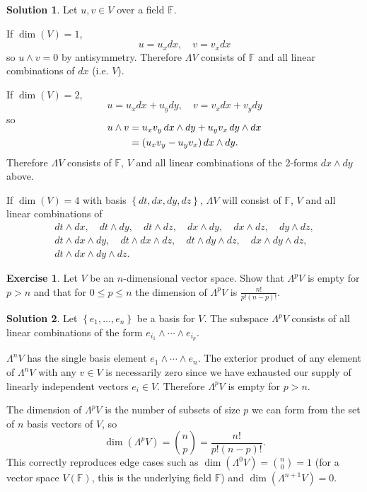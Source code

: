 \documentclass[11pt, a4paper]{report}
\theoremstyle{definition}
\newtheorem{exercise}{Exercise}[part]
\newtheorem{solution}{Solution}[part]
\newenvironment{ex}{\begin{exercise}}{\end{exercise}\pagebreak[1]}
\newenvironment{sol}{\begin{solution}}{\end{solution}\pagebreak[3]}
\renewcommand{\leq}{\leqslant}
\newcommand*{\op}[1]{\ensuremath\mathop{}\mathopen{}#1}
\renewcommand*{\d}{\op{d}}
\begin{document}
\begin{sol}

Let $u, v \in V$ over a field $\mathbb{F}$.

If $\dim(V) = 1$,
\[
    u = u_x dx, \quad v = v_x dx
\]
so $u \wedge v = 0$ by antisymmetry. Therefore $\Lambda V$ consists of $\mathbb{F}$ and all linear combinations of $dx$ (i.e. $V$).

If $\dim(V) = 2$,
\[
    u = u_x dx + u_y dy, \quad v = v_x dx + v_y dy
\]
so
\begin{align*}
    \SwapAboveDisplaySkip
    u \wedge v &= u_x v_y \d x \wedge dy + u_y v_x \d y \wedge dx \\
               &= (u_x v_y - u_y v_x) \d x \wedge dy.
\end{align*}
Therefore $\Lambda V$ consists of $\mathbb{F}$, $V$ and all linear combinations of the 2-forms $dx \wedge dy$ above.

If $\dim(V) = 4$ with basis $\left\{dt, dx, dy, dz\right\}$, $\Lambda V$ will consist of $\mathbb{F}$, $V$ and all linear combinations of
\begin{gather*}
    dt \wedge dx, \quad
    dt \wedge dy, \quad
    dt \wedge dz, \quad
    dx \wedge dy, \quad
    dx \wedge dz, \quad
    dy \wedge dz, \\
    dt \wedge dx \wedge dy, \quad
    dt \wedge dx \wedge dz, \quad
    dt \wedge dy \wedge dz, \quad
    dx \wedge dy \wedge dz, \\
    dt \wedge dx \wedge dy \wedge dz.
\end{gather*}

\end{sol}

\begin{ex}

Let $V$ be an $n$-dimensional vector space. Show that $\Lambda^p V$ is empty for $p > n$ and that for $0 \leq p \leq n$ the dimension of $\Lambda^p V$ is $\frac{n!}{p! (n - p)!}$.

\end{ex}

\begin{sol}

Let $\left\{e_1, \ldots, e_n\right\}$ be a basis for $V$.
The subspace $\Lambda^p V$ consists of all linear combinations of the form $e_{i_1} \wedge \cdots \wedge e_{i_p}$.

$\Lambda^n V$ has the single basis element $e_1 \wedge \cdots \wedge e_n$.
The exterior product of any element of $\Lambda^n V$ with any $v \in V$ is necessarily zero since we have exhausted our supply of linearly independent vectors $e_i \in V$. Therefore $\Lambda^p V$ is empty for $p > n$.

The dimension of $\Lambda^p V$ is the number of subsets of size $p$ we can form from the set of $n$ basis vectors of $V$, so
\[
    \dim(\Lambda^p V) = \binom{n}{p} = \frac{n!}{p! (n - p)!}.
\]
This correctly reproduces edge cases such as $\dim(\Lambda^0 V) = \binom{n}{0} = 1$ (for a vector space $V(\mathbb{F})$, this is the underlying field $\mathbb{F}$) and $\dim(\Lambda^{n+1}V) = 0$.

\end{sol}
\end{document}
